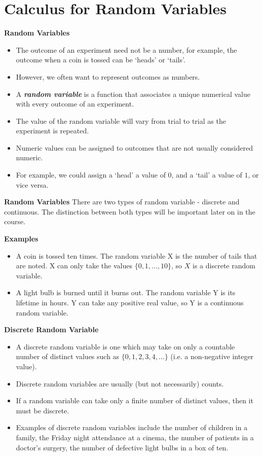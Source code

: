 \documentclass[00-IntroStatsMaster.tex]{subfiles}
\begin{document}
	
	\chapter{Calculus for Random Variables}

{
	\textbf{Random Variables}
	\begin{itemize} \item The outcome of an experiment need not be a number, for example, the outcome when a coin is tossed can be `heads' or `tails'. \item
		However, we often want to represent outcomes as numbers. \item
		A \textbf{\emph{random variable}} is a function that associates a unique numerical value with every outcome of an experiment.
		\item The value of the random variable will vary from trial to trial as the experiment is repeated.
		\item Numeric values can be assigned to outcomes that are not usually considered numeric. \item For example, we could assign a `head' a value of $0$, and a `tail' a value of $1$, or vice versa.
	\end{itemize}
}
{
	\textbf{Random Variables}
	There are two types of random variable - discrete and continuous. The distinction between both types will be important later on in the course.\\ \bigskip
	
	\textbf{Examples}
	\begin{itemize}
		\item A coin is tossed ten times. The random variable X is the number of tails that are noted.
		X can only take the values $\{0, 1, ..., 10\}$, so $X$ is a discrete random variable.
		\item A light bulb is burned until it burns out. The random variable Y is its lifetime in hours.
		Y can take any positive real value, so Y is a continuous random variable.
	\end{itemize}
}

{
	\textbf{Discrete Random Variable}
	\begin{itemize}
		\item A discrete random variable is one which may take on only a countable number of distinct values such as $\{0, 1, 2, 3, 4, ... \}$ (i.e. a non-negative integer value).\item Discrete random variables are usually (but not necessarily) counts. \item If a random variable can take only a finite number of distinct values, then it must be discrete. \item Examples of discrete random variables include the number of children in a family, the Friday night attendance at a cinema, the number of patients in a doctor's surgery, the number of defective light bulbs in a box of ten.
	\end{itemize}
}
\end{document}
